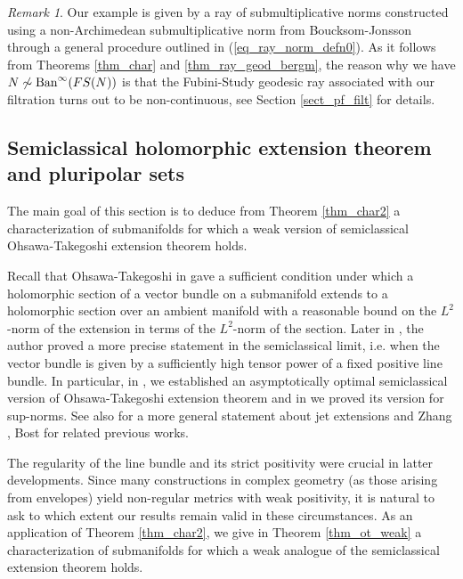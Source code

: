 \documentclass[12pt]{article}
\numberwithin{equation}{section}
\theoremstyle{theorem}
\theoremstyle{definition}
\theoremstyle{remark}
\newtheorem{rem}[thm]{Remark}
\begin{document}
	\begin{rem}\label{rem_ex_non_cont_ray}
		Our example is given by a ray of submultiplicative norms constructed using a non-Archimedean submultiplicative norm from Boucksom-Jonsson \cite[Example 2.25]{BouckJohn21} through a general procedure outlined in (\ref{eq_ray_norm_defn0}).
		As it follows from Theorems \ref{thm_char} and \ref{thm_ray_geod_bergm}, the reason why we have $N \not\sim {\rm{Ban}}^{\infty}(FS(N))$ is that the Fubini-Study geodesic ray associated with our filtration turns out to be non-continuous, see Section \ref{sect_pf_filt} for details.
	\end{rem}
	
	\subsection{Semiclassical holomorphic extension theorem and pluripolar sets}\label{sect_hol_ext_pp}
	The main goal of this section is to deduce from Theorem \ref{thm_char2} a characterization of submanifolds for which a weak version of semiclassical Ohsawa-Takegoshi extension theorem holds.
	\par 
	Recall that Ohsawa-Takegoshi in \cite{OhsTak1} gave a sufficient condition under which a holomorphic section of a vector bundle on a submanifold extends to a holomorphic section over an ambient manifold with a reasonable bound on the $L^2$-norm of the extension in terms of the $L^2$-norm of the section. 
	Later in \cite{FinOTAs}, the author proved a more precise statement in the semiclassical limit, i.e. when the vector bundle is given by a sufficiently high tensor power of a fixed positive line bundle.
	In particular, in \cite[Theorem 1.1]{FinOTAs}, we established an asymptotically optimal semiclassical version of Ohsawa-Takegoshi extension theorem and in \cite[Theorem 1.10]{FinOTAs} we proved its version for sup-norms. See also \cite[Theorems 1.1 and 1.3]{FinOTRed} for a more general statement about jet extensions and Zhang \cite{ZhangPosLinBun}, Bost \cite{BostDwork} for related previous works.
	\par 
	The regularity of the line bundle and its strict positivity were crucial in latter developments. 
	Since many constructions in complex geometry (as those arising from envelopes) yield non-regular metrics with weak positivity, it is natural to ask to which extent our results remain valid in these circumstances. 
	As an application of Theorem \ref{thm_char2}, we give in Theorem \ref{thm_ot_weak} a characterization of submanifolds for which a weak analogue of the semiclassical extension theorem holds.
\end{document}

